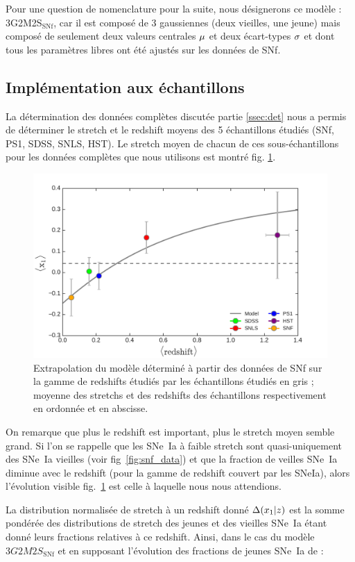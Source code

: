 \documentclass[a4paper, 12pt, svgnames]{article}
\begin{document}
Pour une question de nomenclature pour la suite, nous désignerons ce modèle :
3G2M2S$_{\mathrm{SNf}}$, car il est composé de 3 gaussiennes (deux vieilles, une
jeune) mais composé de seulement deux valeurs centrales $\mu$ et deux écart-types
$\sigma$ et dont tous les paramètres libres ont été ajustés sur les données de SNf.

\subsection{Implémentation aux échantillons}\label{ssec:model}

La détermination des données complètes discutée partie \ref{ssec:det} nous a
permis de déterminer le stretch et le redshift moyens des 5 échantillons étudiés
(SNf, PS1, SDSS, SNLS, HST). Le stretch moyen de chacun de ces sous-échantillons
pour les données complètes que nous utilisons est montré fig.
\ref{fig:model_snf}. \bigbreak

\begin{figure}[htbp!]
    \centering
    \includegraphics[width=.5\linewidth]{Rapport_figures/model_snf.pdf}
    \captionsetup{justification=centering}
    \caption{Extrapolation du modèle déterminé à partir des données de SNf sur
    la gamme de redshifts étudiés par les échantillons étudiés en gris ; moyenne
des stretchs et des redshifts des échantillons respectivement en ordonnée et en
abscisse.}
    \label{fig:model_snf}
\end{figure}

On remarque que plus le redshift est important, plus le stretch moyen semble
grand. Si l'on se rappelle que les SNe~Ia à faible stretch sont quasi-uniquement
des SNe~Ia vieilles (voir fig~\ref{fig:snf_data}) et que la fraction de veilles
SNe~Ia diminue avec le redshift (pour la gamme de redshift couvert par les
SNeIa), alors l'évolution visible fig.~\ref{fig:model_snf} est celle à laquelle
nous nous attendions. \bigbreak

La distribution normalisée de stretch à un redshift donné $\Delta(x_1 | z)$ est la
somme pondérée des distributions de stretch des jeunes et des vieilles SNe~Ia
étant donné leurs fractions relatives à ce redshift. Ainsi, dans le cas du
modèle $3G2M2S_{\mathrm{SNf}}$ et en supposant l'évolution des fractions de
jeunes SNe~Ia de \cite{rigault_strong_2018} :
\end{document}
